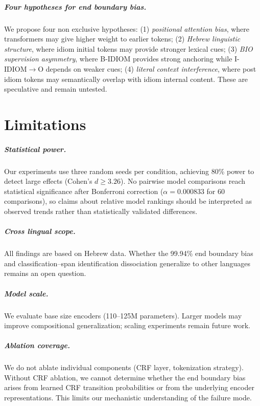 \documentclass[11pt, a4paper]{report}
\begin{document}
\paragraph{Four hypotheses for end boundary bias.}
We propose four non exclusive hypotheses: (1) \textit{positional attention bias}, where transformers may give higher weight to earlier tokens; (2) \textit{Hebrew linguistic structure}, where idiom initial tokens may provide stronger lexical cues; (3) \textit{BIO supervision asymmetry}, where B-IDIOM provides strong anchoring while I-IDIOM$\rightarrow$O depends on weaker cues; (4) \textit{literal context interference}, where post idiom tokens may semantically overlap with idiom internal content. These are speculative and remain untested.


\chapter{Limitations}

\paragraph{Statistical power.}
Our experiments use three random seeds per condition, achieving 80\% power to detect large effects (Cohen's $d \geq 3.26$). No pairwise model comparisons reach statistical significance after Bonferroni correction ($\alpha = 0.000833$ for 60 comparisons), so claims about relative model rankings should be interpreted as observed trends rather than statistically validated differences.

\paragraph{Cross lingual scope.}
All findings are based on Hebrew data. Whether the 99.94\% end boundary bias and classification--span identification dissociation generalize to other languages remains an open question.

\paragraph{Model scale.}
We evaluate base size encoders (110--125M parameters). Larger models may improve compositional generalization; scaling experiments remain future work.

\paragraph{Ablation coverage.}
We do not ablate individual components (CRF layer, tokenization strategy). Without CRF ablation, we cannot determine whether the end boundary bias arises from learned CRF transition probabilities or from the underlying encoder representations. This limits our mechanistic understanding of the failure mode.
\end{document}
